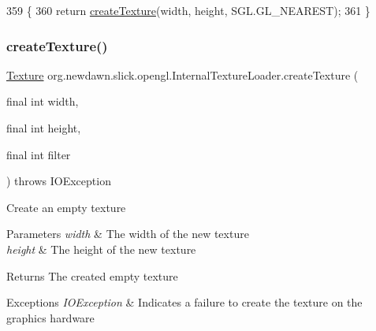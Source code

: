 \begin{DoxyCode}
359                                                                                        \{
360         \textcolor{keywordflow}{return} \mbox{\hyperlink{classorg_1_1newdawn_1_1slick_1_1opengl_1_1_internal_texture_loader_a153ef66a72ef567377e97b6e9604f7a1}{createTexture}}(width, height, SGL.GL\_NEAREST);
361     \}
\end{DoxyCode}
\mbox{\label{classorg_1_1newdawn_1_1slick_1_1opengl_1_1_internal_texture_loader_ad8179a3093383267b4474ff018efed90}} 
\subsubsection{\texorpdfstring{create\+Texture()}{createTexture()}\hspace{0.1cm}{\footnotesize\ttfamily [2/2]}}
{\footnotesize\ttfamily \mbox{\hyperlink{interfaceorg_1_1newdawn_1_1slick_1_1opengl_1_1_texture}{Texture}} org.\+newdawn.\+slick.\+opengl.\+Internal\+Texture\+Loader.\+create\+Texture (\begin{DoxyParamCaption}\item[{final int}]{width,  }\item[{final int}]{height,  }\item[{final int}]{filter }\end{DoxyParamCaption}) throws I\+O\+Exception\hspace{0.3cm}{\ttfamily [inline]}}

Create an empty texture


\begin{DoxyParams}{Parameters}
{\em width} & The width of the new texture \\
\hline
{\em height} & The height of the new texture \\
\hline
\end{DoxyParams}
\begin{DoxyReturn}{Returns}
The created empty texture 
\end{DoxyReturn}

\begin{DoxyExceptions}{Exceptions}
{\em I\+O\+Exception} & Indicates a failure to create the texture on the graphics hardware \\
\hline
\end{DoxyExceptions}

